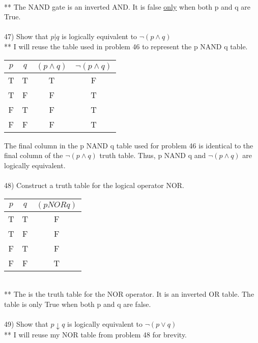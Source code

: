 \documentclass{article}
\begin{document}
\begin{flushleft}
\begin{table}[ht]
\begin{tabular}{|c|c||c|}
\end{tabular}
\label{table:tt1}
\end{table}
~\\ ** The NAND gate is an inverted AND.  It is false \underline{only} when both p and q are True.
~\\~\\
47) Show that $p | q$ is logically equivalent to $\neg (p \land q)$ \\
** I will reuse the table used in problem 46 to represent the p NAND q table.\\
\begin{table}[ht]

\begin{tabular}{|c|c||c|c|}

$ p $ & $ q $ & $ (p \wedge q) $ & $  \neg (p \wedge q) $ \\
\hline
T & T & T & F \\
\hline
T & F & F & T \\
\hline
F & T & F & T \\
\hline
F & F & F & T \\

\end{tabular}
\label{table:tt1}
\end{table}
The final column in the p NAND q table used for problem 46 is identical to the final column of the $\neg (p \land q)$ truth table.  Thus, p NAND q and $\neg (p \land q)$ are logically equivalent.
~\\~\\48) Construct a truth table for the logical operator NOR.
\begin{table}[ht]

\begin{tabular}{|c|c||c|}

$ p $ & $ q $ & $ (p NOR q) $ \\
\hline
T & T & F \\
\hline
T & F & F \\
\hline
F & T & F \\
\hline
F & F & T \\

\end{tabular}
\label{table:tt1}
\end{table}
\\ ** The is the truth table for the NOR operator.  It is an inverted OR table.  The table is only True when both p and q are false. \\

~\\49) Show that $p \downarrow q$ is logically equivalent to $\neg (p \lor q)$
\\ ** I will reuse my NOR table from problem 48 for brevity.


\end{flushleft}
\end{document}
